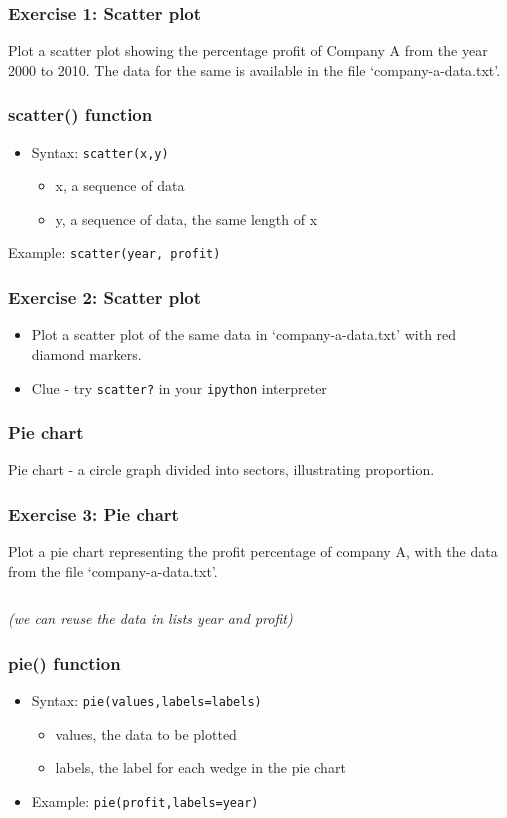 \documentclass[17pt,compress]{beamer}
\begin{document}
\begin{frame}
\frametitle{Exercise 1: Scatter plot}
\label{sec-5}
Plot a scatter plot showing the percentage profit of Company A from the year 2000
to 2010. The data for the same is available in the file `company-a-data.txt'.
\end{frame}
\begin{frame}[fragile]
\frametitle{scatter() function}
\label{sec-6}
\begin{itemize}
\item Syntax: \texttt{scatter(x,y)}\pause
\begin{itemize}
\item x, a sequence of data\pause
\item y, a sequence of data, the same length of x\pause
\end{itemize}
\end{itemize}
Example: \texttt{scatter(year, profit)}
\end{frame}
\begin{frame}[fragile]
\frametitle{Exercise 2: Scatter plot}
\label{sec-7}
\begin{itemize}
\item Plot a scatter plot of the same data in `company-a-data.txt' with red diamond markers.\pause
\item Clue - try \texttt{scatter?} in your \texttt{ipython} interpreter
\end{itemize}
\end{frame}
\begin{frame}
\frametitle{Pie chart}
\label{sec-8}
Pie chart - a circle graph divided into sectors, illustrating proportion.
\end{frame}
\begin{frame}[fragile]
\frametitle{Exercise 3: Pie chart}
\label{sec-9}
Plot a pie chart representing the profit percentage of company A, with the data
from the file `company-a-data.txt'.\pause
\begin{verbatim}
\end{verbatim}
\emph{(we can reuse the data in lists year and profit)}
\end{frame}
\begin{frame}[fragile]
\frametitle{pie() function}
\label{sec-10}
\begin{itemize}
\item Syntax: \texttt{pie(values,labels=labels)}\pause
\begin{itemize}
\item values, the data to be plotted\pause
\item labels, the label for each wedge in the pie chart\pause
\end{itemize}

\item Example: \texttt{pie(profit,labels=year)}
\end{itemize}
\end{frame}
\end{document}
